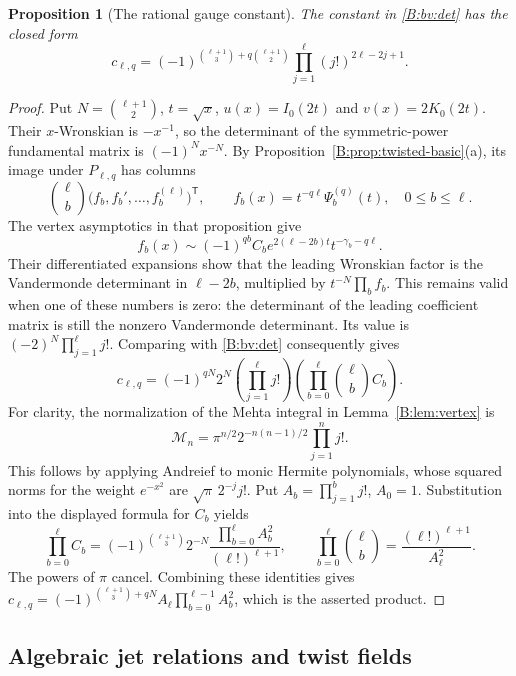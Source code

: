 \documentclass[11pt,a4paper]{article}
\newtheorem{proposition}[theorem]{Proposition}
\theoremstyle{definition}
\theoremstyle{remark}
\numberwithin{equation}{section}
\begin{document}
\begin{proposition}[The rational gauge constant]\label{B:bv:constant}
The constant in \eqref{B:bv:det} has the closed form
\[
 c_{\ell,q}=(-1)^{\binom{\ell+1}{3}+q\binom{\ell+1}{2}}
          \prod_{j=1}^{\ell}(j!)^{2\ell-2j+1}.
\]
\end{proposition}
\begin{proof}
Put $N=\binom{\ell+1}{2}$, $t=\sqrt{x}$,
$u(x)=I_0(2t)$ and $v(x)=2K_0(2t)$.
Their $x$-Wronskian is $-x^{-1}$, so the determinant of the
symmetric-power fundamental matrix is $(-1)^Nx^{-N}$.
By Proposition~\ref{B:prop:twisted-basic}(a), its image under
$P_{\ell,q}$ has columns
\[
 \binom{\ell}{b}
 \bigl(f_b,f_b',\ldots,f_b^{(\ell)}\bigr)^{\mathsf T},
 \qquad f_b(x)=t^{-q\ell}\Psi_b^{(q)}(t),\quad 0\le b\le\ell.
\]
The vertex asymptotics in that proposition give
\[
 f_b(x)\sim(-1)^{qb}C_b e^{2(\ell-2b)t}
                   t^{-\gamma_b-q\ell}.
\]
Their differentiated expansions show that the leading Wronskian
factor is the Vandermonde determinant in $\ell-2b$, multiplied
by $t^{-N}\prod_bf_b$. This remains valid when one of these
numbers is zero: the determinant of the leading coefficient
matrix is still the nonzero Vandermonde determinant.
Its value is $(-2)^N\prod_{j=1}^{\ell}j!$.
Comparing with \eqref{B:bv:det} consequently gives
\[
 c_{\ell,q}=(-1)^{qN}2^N
  \left(\prod_{j=1}^{\ell}j!\right)
  \left(\prod_{b=0}^{\ell}\binom{\ell}{b}C_b\right).
\]
For clarity, the normalization of the Mehta integral in
Lemma~\ref{B:lem:vertex} is
\[
 \mathcal M_n=\pi^{n/2}2^{-n(n-1)/2}\prod_{j=1}^n j!.
\]
This follows by applying Andreief to monic Hermite polynomials,
whose squared norms for the weight $e^{-x^2}$ are
$\sqrt{\pi}\,2^{-j}j!$. Put $A_b=\prod_{j=1}^b j!$, $A_0=1$.
Substitution into the displayed formula for $C_b$ yields
\[
 \prod_{b=0}^{\ell}C_b
 =(-1)^{\binom{\ell+1}{3}}2^{-N}
       \frac{\prod_{b=0}^{\ell}A_b^2}{(\ell!)^{\ell+1}},
 \qquad
 \prod_{b=0}^{\ell}\binom{\ell}{b}
       =\frac{(\ell!)^{\ell+1}}{A_\ell^2}.
\]
The powers of $\pi$ cancel. Combining these identities gives
$c_{\ell,q}=(-1)^{\binom{\ell+1}{3}+qN}
 A_\ell\prod_{b=0}^{\ell-1}A_b^2$, which is the asserted product.
\end{proof}

\subsection{Algebraic jet relations and twist fields}
\end{document}
